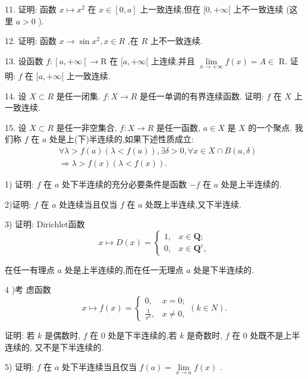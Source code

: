 11. 证明: 函数 $x \mapsto  {x}^{2}$ 在 $x \in  \left\lbrack  {0,a}\right\rbrack$ 上一致连续,但在 $\lbrack 0, + \infty \lbrack$ 上不一致连续 (这里 $a > 0$ ).

12. 证明: 函数 $x \rightarrow  \sin {x}^{2},x \in  R$ ,在 $R$ 上不一致连续.

13. 设函数 $f : \left\lbrack  {a, + \infty \left\lbrack  { \rightarrow  \mathrm{R}}\right. }\right.$ 在 $\lbrack a, + \infty \lbrack$ 上连续,并且 $\mathop{\lim }\limits_{{x \rightarrow   + \infty }}f\left( x\right)  = A \in$ R. 证明: $f$ 在 $\lbrack a, + \infty \lbrack$ 上一致连续.

14. 设 $X \subset  R$ 是任一闭集. $f : X \rightarrow  R$ 是任一单调的有界连续函数. 证明: $f$ 在 $X$ 上一致连续.

15. 设 $X \subset  R$ 是任一非空集合, $f : X \rightarrow  R$ 是任一函数, $a \in  X$ 是 $X$ 的一个聚点. 我们称 $f$ 在 $a$ 处是上(下)半连续的,如果下述性质成立:
\begin{align*}
	&\forall \lambda  > f\left( a\right) \left( {\lambda  < f\left( a\right) }\right) ,\exists \delta  > 0,\forall x \in  X \cap  B\left( {a,\delta }\right)\\
	&\Rightarrow  \lambda  > f\left( x\right) \left( {\lambda  < f\left( x\right) }\right) .
\end{align*}

1) 证明: $f$ 在 $a$ 处下半连续的充分必要条件是函数 $- f$ 在 $a$ 处是上半连续的.

2)证明: $f$ 在 $a$ 处连续当且仅当 $f$ 在 $a$ 处既上半连续,又下半连续.

3) 证明: Dirichlet函数
$$x \mapsto  D\left( x\right)  = \left\{  \begin{array}{ll} 1, & x \in  \mathbf{Q}; \\  0, & x \in  {\mathbf{Q}}^{c}, \end{array}\right.$$

在任一有理点 $a$ 处是上半连续的,而在任一无理点 $a$ 处是下半连续的.

4 )考 虑函数
$$x \mapsto  f\left( x\right)  = \left\{  {\begin{array}{ll} 0, & x = 0; \\  \frac{1}{{x}^{k}}, & x \neq  0, \end{array}\left( {k \in  N}\right) .}\right.$$

证明: 若 $k$ 是偶数时, $f$ 在 0 处是下半连续的,若 $k$ 是奇数时, $f$ 在 0 处既不是上半连续的, 又不是下半连续的.

5) 证明: $f$ 在 $a$ 处下半连续当且仅当 $f\left( a\right)  = \mathop{\lim }\limits_{{x \rightarrow  a}}f\left( x\right)$ .


